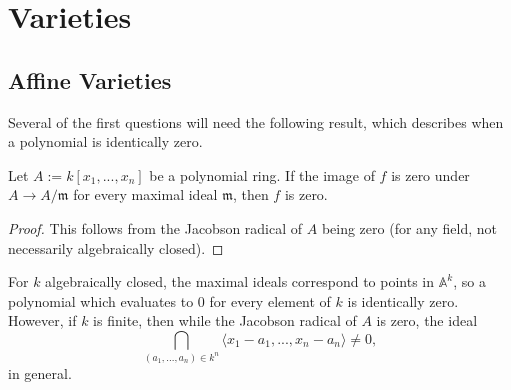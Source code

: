



\section{Varieties}
\subsection{Affine Varieties}
Several of the first questions will need the following result, which describes
when a polynomial is identically zero.

\begin{lem}\label{ident-zero}
Let $A := k[x_1, ..., x_n]$ be a polynomial ring. If the image of $f$ is zero
under $A \rightarrow A / \mathfrak{m}$ for every maximal ideal $\mathfrak{m}$,
then $f$ is zero.
\end{lem}
\begin{proof}
This follows from the Jacobson radical of $A$ being zero (for any field, not
necessarily algebraically closed). 
\end{proof}

For $k$ algebraically closed, the maximal ideals correspond to points
in $\mathbb{A}^k$, so a polynomial which evaluates to 0 for every element of $k$
is identically zero. However, if $k$ is finite, then while the Jacobson radical
of $A$ is zero, the ideal
\[
\bigcap_{(a_1, ..., a_n) \in k^n} \langle x_1 - a_1, ..., x_n - a_n \rangle
\neq 0,
\]
in general.

